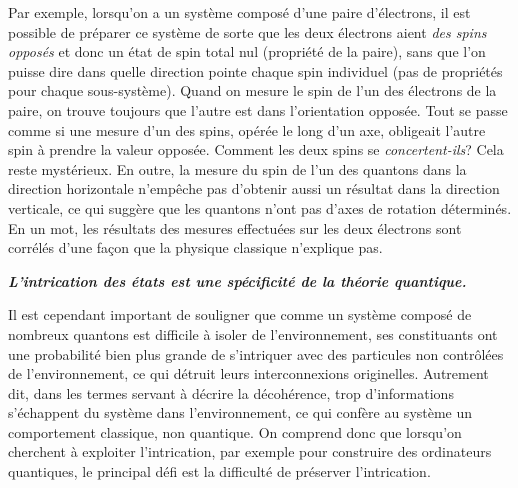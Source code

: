 Par exemple, lorsqu'on a un système composé d'une paire d'électrons, il est
possible de préparer ce système de sorte que les deux électrons aient \emph{des
spins opposés} et donc un état de spin total nul  (propriété de la paire), sans
que l'on puisse dire dans quelle direction pointe chaque spin individuel (pas de
propriétés pour chaque sous-système). Quand on mesure le spin de l'un des
électrons de la paire, on trouve toujours que l'autre est dans l'orientation
opposée. Tout se passe comme si une mesure d'un des spins, opérée le long d'un
axe, obligeait l'autre spin à prendre la valeur opposée. Comment les deux spins
se \emph{concertent-ils}? Cela reste mystérieux. En outre, la mesure du spin de
l'un des quantons dans la direction horizontale n'empêche pas d'obtenir aussi un
résultat dans la direction verticale, ce qui suggère que les quantons n'ont pas
d'axes de rotation déterminés. En un mot, les résultats des mesures effectuées
sur les deux électrons sont corrélés d'une façon que la physique classique
n'explique pas.

\textbf{\emph{L'intrication des états est une spécificité de la théorie
quantique.}}

Il est cependant important de souligner que comme un système composé de nombreux
quantons est difficile à isoler de l'environnement, ses constituants ont une
probabilité bien plus grande de s'intriquer avec des particules non contrôlées
de l'environnement, ce qui détruit leurs interconnexions originelles. Autrement
dit, dans les termes servant à décrire la décohérence, trop d'informations
s'échappent du système dans l'environnement, ce qui confère au système un
comportement classique, non quantique. On comprend donc que lorsqu'on cherchent
à exploiter l'intrication, par exemple pour construire des ordinateurs
quantiques, le principal défi est la difficulté de préserver l'intrication.

